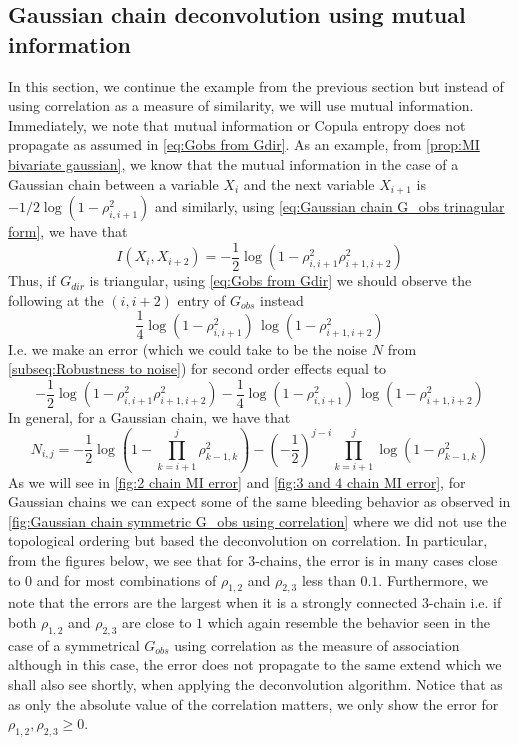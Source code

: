\documentclass[../Thesis.tex]{subfiles}
\begin{document}
\newpage

\subsection{Gaussian chain deconvolution using mutual information}
In this section, we continue the example from the previous section but instead of using correlation as a measure of similarity, we will use mutual information. Immediately, we note that mutual information or Copula entropy does not propagate as assumed in \autoref{eq:Gobs from Gdir}. As an example, from \autoref{prop:MI bivariate gaussian}, we know that the mutual information in the case of a Gaussian chain between a variable $X_i$ and the next variable $X_{i+1}$ is $-1/2 \log\left(1 - \rho_{i,i+1}^2\right)$ and similarly, using \autoref{eq:Gaussian chain G_obs trinagular form}, we have that
$$I\left(X_i, X_{i+2}\right) = -\frac{1}{2} \log \left(1 - \rho_{i,i+1}^2 \rho_{i+1,i+2}^2\right)$$
Thus, if $G_{dir}$ is triangular, using \autoref{eq:Gobs from Gdir} we should observe the following at the $(i,i+2)$ entry of $G_{obs}$ instead
$$\frac{1}{4} \log\left(1 - \rho_{i,i+1}^2\right)\,\log\left(1 - \rho_{i+1,i+2}^2\right)$$
I.e. we make an error (which we could take to be the noise $N$ from \autoref{subseq:Robustness to noise}) for second order effects equal to
$$-\frac{1}{2} \log \left(1 - \rho_{i,i+1}^2 \rho_{i+1,i+2}^2\right) - \frac{1}{4} \log\left(1 - \rho_{i,i+1}^2\right)\,\log\left(1 - \rho_{i+1,i+2}^2\right)$$
In general, for a Gaussian chain, we have that
$$N_{i,j} = -\frac{1}{2} \log\left( 1 - \prod_{k=i+1}^{j} \rho_{k-1,k}^2\right) - \left(-\frac{1}{2}\right)^{j-i}\prod_{k=i+1}^{j} \log\left(1 - \rho_{k-1,k}^2\right)$$
As we will see in \autoref{fig:2 chain MI error} and \autoref{fig:3 and 4 chain MI error}, for Gaussian chains we can expect some of the same bleeding behavior as observed in \autoref{fig:Gaussian chain symmetric G_obs using correlation} where we did not use the topological ordering but based the deconvolution on correlation. In particular, from the figures below, we see that for $3$-chains, the error is in many cases close to $0$ and for most combinations of $\rho_{1,2}$ and $\rho_{2,3}$ less than $0.1$. Furthermore, we note that the errors are the largest when it is a strongly connected $3$-chain i.e. if both $\rho_{1,2}$ and $\rho_{2,3}$ are close to $1$ which again resemble the behavior seen in the case of a symmetrical $G_{obs}$ using correlation as the measure of association although in this case, the error does not propagate to the same extend which we shall also see shortly, when applying the deconvolution algorithm. Notice that as as only the absolute value of the correlation matters, we only show the error for $\rho_{1,2}, \rho_{2,3} \geq 0$.
\end{document}
